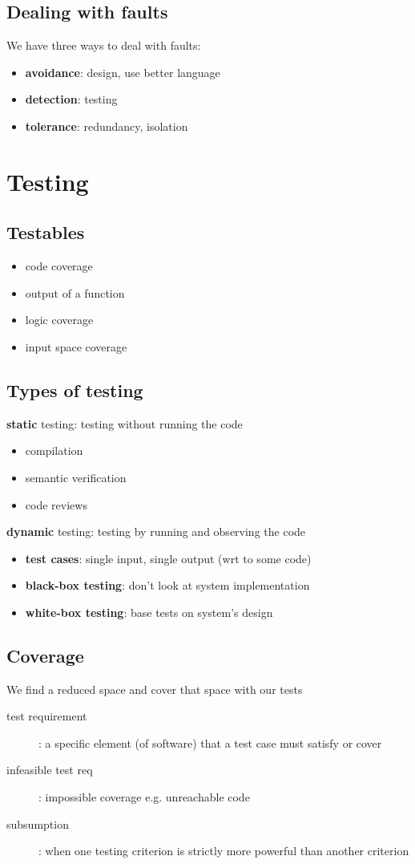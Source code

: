 \documentclass[]{article}
\theoremstyle{definition}
\begin{document}
		\subsection{Dealing with faults}
			We have three ways to deal with faults:
			\begin{itemize}
				\item \textbf{avoidance}: design, use better language
				\item \textbf{detection}: testing
				\item \textbf{tolerance}: redundancy, isolation
			\end{itemize}								
	\section{Testing}
		\subsection{Testables}
			\begin{itemize}
				\item code coverage
				\item output of a function
				\item logic coverage
				\item input space coverage
			\end{itemize}
		\subsection{Types of testing}
			\textbf{static} testing: testing without running the code
			\begin{itemize}
				\item compilation
				\item semantic verification
				\item code reviews
			\end{itemize}
			\textbf{dynamic} testing: testing by running and observing the code
			\begin{itemize}
				\item \textbf{test cases}: single input, single output (wrt to some code)
				\item \textbf{black-box testing}: don't look at system implementation
				\item \textbf{white-box testing}: base tests on system's design
			\end{itemize}
		\subsection{Coverage}
			We find a reduced space and cover that space with our tests
			\begin{description}
				\item[test requirement]: a specific element (of software) that a test case must satisfy or cover
				\item[infeasible test req]: impossible coverage e.g. unreachable code
				\item[subsumption]: when one testing criterion is strictly more powerful than another criterion
			\end{description}
			
\end{document}

